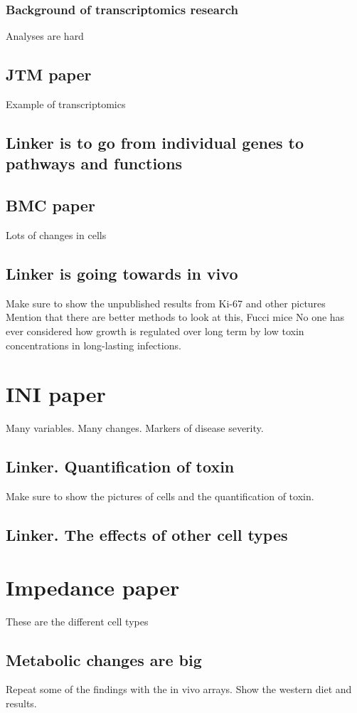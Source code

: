 \subsubsection{ Background of transcriptomics research }
Analyses are hard

\subsection{JTM paper}
Example of transcriptomics
\subsection{ Linker is to go from individual genes to pathways and functions }

\subsection{BMC paper}
Lots of changes in cells
\subsection{Linker is going towards in vivo}
Make sure to show the unpublished results from Ki-67 and other pictures
Mention that there are better methods to look at this, Fucci mice
No one has ever considered how growth is regulated over long term by
low toxin concentrations in long-lasting infections.

\section{INI paper}
Many variables. Many changes. Markers of disease severity.

\subsection{Linker. Quantification of toxin}
Make sure to show the pictures of cells and the quantification of toxin.

\subsection{Linker. The effects of other cell types}

\section{Impedance paper}
These are the different cell types

\subsection{Metabolic changes are big}
Repeat some of the findings with the in vivo arrays.
Show the western diet and results.

